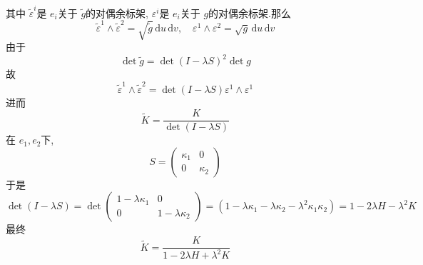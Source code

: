 \documentclass[../../main.tex]{subfiles}
\begin{document}
\begin{solution}
\begin{enumerate}
\[        \]其中 \(   \tilde{\varepsilon} ^{i}  \)是 \(  e_{i}  \)关于 \(  \tilde{g}  \)的对偶余标架, \(   \varepsilon ^{i}  \)是 \(  e_{i}  \)关于 \(  g  \)的对偶余标架.那么 \[
         \tilde{\varepsilon} ^{1}\wedge  \tilde{\varepsilon} ^{2}= \sqrt{\tilde{g} } \,\mathrm{d} u\,\mathrm{d} v,\quad   \varepsilon ^{1}\wedge  \varepsilon ^{2}= \sqrt{g}\,\mathrm{d} u\,\mathrm{d} v
        \]        由于 \[
        \det \tilde{g} = \det \left( I-  \lambda S \right)^{2}\det g 
        \]故 \[
         \tilde{\varepsilon} ^{1}\wedge  \tilde{\varepsilon} ^{2}= \det \left( I- \lambda S \right) \varepsilon ^{1}\wedge  \varepsilon ^{1} 
        \]进而 \[
        \tilde{K}= \frac{K }{\det \left( I- \lambda S \right)  } 
        \]在 \(  e_1,e_2  \)下, \[
        S= \begin{pmatrix} 
             \kappa _1 &0\\ 
              0& \kappa _2  
        \end{pmatrix} 
        \] 于是 \[
        \det \left( I- \lambda S \right)= \det \begin{pmatrix} 
            1-  \lambda \kappa _1 &0\\ 
             0&1-  \lambda \kappa _2  
        \end{pmatrix}= \left( 1-  \lambda \kappa _1 -  \lambda \kappa _2 -  \lambda ^{2}\kappa _1  \kappa _2  \right)=    1-2 \lambda H- \lambda ^{2}K
        \]最终 \[
        \tilde{K}= \frac{K }{1-2 \lambda H+  \lambda ^{2}K } 
        \]

    \end{enumerate}
    
\end{solution}

\hspace*{\fill} 
\end{document}
